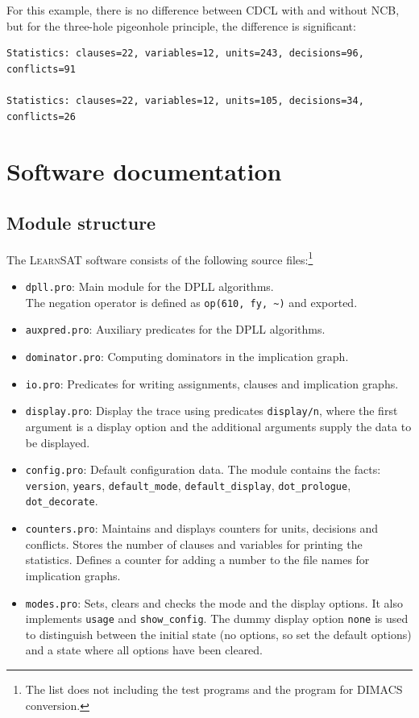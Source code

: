 \documentclass[11pt]{report}
\newcommand*{\p}[1]{\textup{\texttt{#1}}}
\newcommand*{\ls}{\textsc{LearnSAT}}
\begin{document}
For this example, there is no difference between CDCL with and without
NCB, but for the three-hole pigeonhole principle, the difference is
significant:
\begin{verbatim}
Statistics: clauses=22, variables=12, units=243, decisions=96, conflicts=91

Statistics: clauses=22, variables=12, units=105, decisions=34, conflicts=26
\end{verbatim}


\chapter{Software documentation}

\section{Module structure}

The \ls{} software consists of the following source files:\footnote{The
list does not including the test programs and the program for DIMACS
conversion.}

\begin{itemize}
\item \p{dpll.pro}: Main module for the DPLL algorithms.\\
The negation operator is defined as \verb+op(610, fy, ~)+ and exported.

\item \p{auxpred.pro}: Auxiliary predicates for the DPLL algorithms. 

\item \p{dominator.pro}: Computing dominators in the implication graph. 

\item \p{io.pro}: Predicates for writing assignments, clauses and
implication graphs.

\item \p{display.pro}: Display the trace using predicates \p{display/n},
where the first argument is a display option and the additional
arguments supply the data to be displayed.

\item \p{config.pro}: Default configuration data. The module contains
the facts: \p{version}, \p{years}, \p{default\_mode},
\p{default\_display}, \p{dot\_prologue}, \p{dot\_decorate}.

\item \p{counters.pro}: Maintains and displays counters for units,
decisions and conflicts. Stores the number of clauses and variables for
printing the statistics. Defines a counter for adding a number to the
file names for implication graphs.

\item \p{modes.pro}: Sets, clears and checks the mode and the display
options. It also implements \p{usage} and \p{show\_config}. The dummy
display option \p{none} is used to distinguish between the initial state
(no options, so set the default options) and a state where all options
have been cleared.

\end{itemize}
\end{document}
